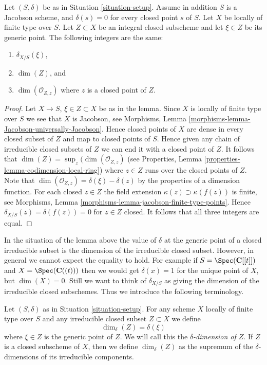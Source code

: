 \begin{lemma}
\label{lemma-delta-is-dimension}
Let $(S, \delta)$ be as in Situation \ref{situation-setup}.
Assume in addition $S$ is a Jacobson scheme, and $\delta(s) = 0$ for every
closed point $s$ of $S$. Let $X$ be locally of finite type over $S$.
Let $Z \subset X$ be an integral closed subscheme and let
$\xi \in Z$ be its generic point. The following integers are the same:
\begin{enumerate}
\item $\delta_{X/S}(\xi)$,
\item $\dim(Z)$, and
\item $\dim(\mathcal{O}_{Z, z})$ where $z$ is a closed point of $Z$.
\end{enumerate}
\end{lemma}

\begin{proof}
Let $X \to S$, $\xi \in Z \subset X$ be as in the lemma.
Since $X$ is locally of finite type over $S$ we see that
$X$ is Jacobson, see
Morphisms, Lemma \ref{morphisms-lemma-Jacobson-universally-Jacobson}.
Hence closed points of $X$ are dense in every closed subset of $Z$
and map to closed points of $S$. Hence given any chain
of irreducible closed subsets of $Z$ we can end it with a closed point of $Z$.
It follows that $\dim(Z) = \sup_z(\dim(\mathcal{O}_{Z, z})$
(see Properties, Lemma \ref{properties-lemma-codimension-local-ring})
where $z \in Z$ runs over the closed points of $Z$.
Note that $\dim(\mathcal{O}_{Z, z}) = \delta(\xi) - \delta(z)$
by the properties of a dimension function.
For each closed $z \in Z$ the field extension
$\kappa(z) \supset \kappa(f(z))$ is finite, see Morphisms,
Lemma \ref{morphisms-lemma-jacobson-finite-type-points}.
Hence $\delta_{X/S}(z) = \delta(f(z)) = 0$ for $z \in Z$ closed.
It follows that all three integers are equal.
\end{proof}

\noindent
In the situation of the lemma above the
value of $\delta$ at the generic point of a closed irreducible subset
is the dimension of the irreducible closed subset.
However, in general we cannot expect the equality to hold.
For example if $S = \Spec(\mathbf{C}[[t]])$ and
$X = \Spec(\mathbf{C}((t)))$ then we would get
$\delta(x) = 1$ for the unique point of $X$, but $\dim(X) = 0$.
Still we want to think of $\delta_{X/S}$ as giving the
dimension of the irreducible closed subschemes. Thus we introduce
the following terminology.

\begin{definition}
\label{definition-delta-dimension}
Let $(S, \delta)$ as in Situation \ref{situation-setup}.
For any scheme $X$ locally of finite type over $S$
and any irreducible closed subset $Z \subset X$ we define
$$
\dim_\delta(Z) = \delta(\xi)
$$
where $\xi \in Z$ is the generic point of $Z$.
We will call this the {\it $\delta$-dimension of $Z$}.
If $Z$ is a closed subscheme of $X$, then we define
$\dim_\delta(Z)$ as the supremum of the $\delta$-dimensions
of its irreducible components.
\end{definition}







